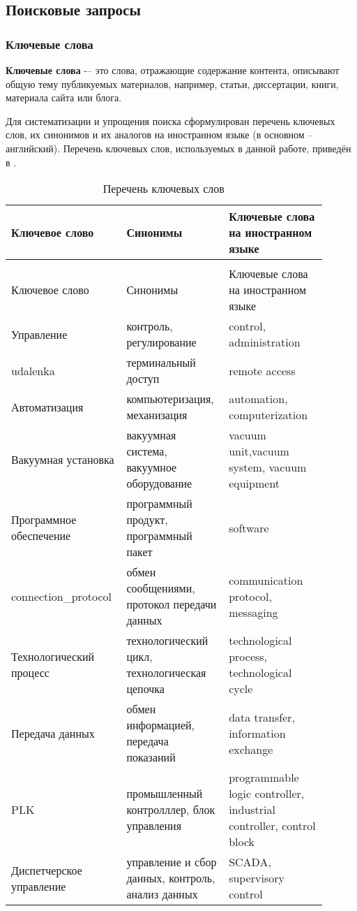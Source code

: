 \subsection{Поисковые запросы}
\subsubsection{Ключевые слова}
\textbf{Ключевые слова } -– это слова, отражающие содержание контента, описывают общую тему публикуемых материалов, например, статьи, диссертации, книги, материала сайта или блога.

Для систематизации и упрощения поиска сформулирован перечень ключевых слов, их синонимов и их аналогов на иностранном языке (в основном -- английский). Перечень ключевых слов, используемых в данной работе, приведён в .
\begin{center}
	\begin{longtable}{|C{0.3\linewidth}|C{0.3\linewidth}|C{0.3\linewidth}|}
		\caption{Перечень ключевых слов}
		\label{tab:keywords}\\
		\hline
		\bfseries \centering Ключевое слово&\bfseries Синонимы & \bfseries Ключевые слова на иностранном языке\\
		\endfirsthead
		\cpt\\
		\hline
		\centering	 Ключевое слово&Синонимы & Ключевые слова на иностранном языке\\
		\endhead
		\hline
		Управление &контроль, регулирование&control, administration\\
		\hline
		\Gls{udalenka} &терминальный доступ&remote access\\
		\hline
		Автоматизация &компьютеризация, механизация&automation, computerization\\
		\hline
		Вакуумная установка &вакуумная система, вакуумное оборудование&vacuum unit,vacuum system, vacuum equipment\\
		\hline
		Программное обеспечение &программный продукт, программный пакет &software\\
		\hline
		\Gls{connection_protocol}&обмен сообщениями, протокол передачи данных&communication protocol, messaging\\
		\hline
		Технологический процесс &технологический цикл, технологическая цепочка&technological process, technological cycle\\
		\hline
		Передача данных &обмен информацией, передача показаний&data transfer, information exchange\\
		\hline
		\Gls{PLK} &промышленный контролллер, блок управления&programmable logic controller, industrial controller, control block\\
		\hline
		Диспетчерское управление & управление и сбор данных, контроль, анализ данных & SCADA, supervisory control\\
		\hline
	\end{longtable}
\end{center}

